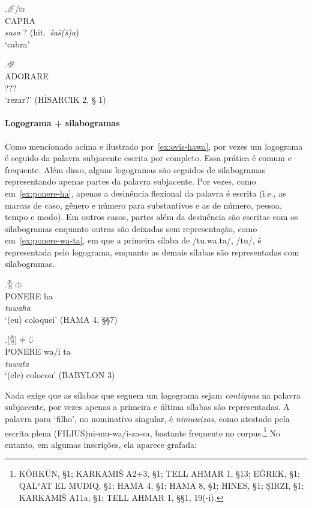 \exg.\label{ex:capra}\Large 𔑶\slash{}𔑷\\
CAPRA\\
\emph{sasa}{ }? (hit.\ \emph{šaš{(š)}a})\\
`cabra'


\exg.\label{ex:adorare}\Large 𔐅  \\
ADORARE\\
???\\
`rezar?' (HİSARCIK 2, § 1)

\paragraph{Logograma + silabogramas}
Como mencionado acima e ilustrado por~\ref{ex:ovis-hawa}, por vezes um logograma
é seguido da palavra subjacente escrita por completo. Essa prática é comum e
frequente.
Além disso, alguns logogramas são seguidos de silabogramas representando apenas
partes da palavra subjacente.
Por vezes, como em~\ref{ex:ponere-ha}, apenas a desinência flexional da
palavra é escrita (i.e., as marcas de caso, gênero e número para substantivos e
as de número, pessoa, tempo e modo).
Em outros casos, partes além da desinência são escritas com os silabogramas
enquanto outras são deixadas sem representação, como em~\ref{ex:ponere-wa-ta},
em que a primeira sílaba de /tu.wa.ta/, /tu/, é representada pelo logograma,
enquanto as demais sílabas são representadas com silabogramas.

\exg.\label{ex:ponere-ha}\Large 𔑇 \Large 𔓷\\
PONERE ha\\
\emph{tuwaha}\\
`(eu) coloquei' (HAMA 4, §§7)

\exg.\label{ex:ponere-wa-ta}\Large [𔑇] \Large 𔗬 \Large 𔑰\\
PONERE wa/i ta\\
\emph{tuwata}\\
`(ele) colocou' (BABYLON 3)


\noindent Nada exige que as sílabas que seguem um logograma sejam
\emph{contíguas} na palavra subjacente, por vezes apenas a primeira e última
sílabas são representadas.
A palavra para `filho', no nominativo singular, é \emph{nimuwizas}, como
atestado pela escrita plena {(FILIUS)}ni-mu-wa/i-za-sa, bastante frequente no
corpus.\footnote{KÖRKÜN, §1; KARKAMIŠ A2+3, §1; TELL AHMAR 1, §13; EĞREK, §1;
	QALʿAT EL MUDIQ, §1; HAMA 4, §1; HAMA 8, §1; HINES, §1; ŞIRZI, §1;
	KARKAMIŠ A11a, §1; TELL AHMAR 1, §§1, 19(-i).}
No entanto, em algumas inscrições, ela aparece grafada:

